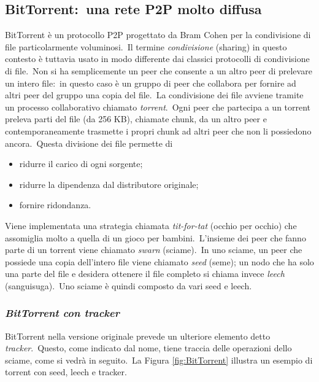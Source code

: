 \subsection{BitTorrent:\ una rete P2P molto diffusa}

BitTorrent è un protocollo P2P progettato da Bram Cohen per la condivisione di file particolarmente voluminosi.\
Il termine \emph{condivisione} (sharing) in questo contesto è tuttavia usato in modo differente dai classici protocolli di condivisione di file.\
Non si ha semplicemente un peer che consente a un altro peer di prelevare un intero file:\ in questo caso è un gruppo di peer che collabora per fornire ad altri peer del gruppo una copia del file.\
La condivisione dei file avviene tramite un processo collaborativo chiamato \emph{torrent}.\
Ogni peer che partecipa a un torrent preleva parti del file (da 256 KB), chiamate chunk, da un altro peer e contemporaneamente trasmette i propri chunk ad altri peer che non li possiedono ancora.\
Questa divisione dei file permette di

\begin{itemize}
    \item ridurre il carico di ogni sorgente;
    \item ridurre la dipendenza dal distributore originale;
    \item fornire ridondanza.
\end{itemize}

\noindent Viene implementata una strategia chiamata \emph{tit-for-tat} (occhio per occhio) che assomiglia molto a quella di un gioco per bambini.\
L'insieme dei peer che fanno parte di un torrent viene chiamato \emph{swarn} (sciame).\
In uno sciame, un peer che possiede una copia dell'intero file viene chiamato \emph{seed} (seme); un nodo che ha solo una parte del file e desidera ottenere il file completo si chiama invece \emph{leech} (sanguisuga).\
Uno sciame è quindi composto da vari seed e leech.

\subsubsection{\emph{BitTorrent con tracker}}

BitTorrent nella versione originale prevede un ulteriore elemento detto \emph{tracker}.\
Questo, come indicato dal nome, tiene traccia delle operazioni dello sciame, come si vedrà in seguito.\
La Figura \ref{fig:BitTorrent} illustra un esempio di torrent con seed, leech e tracker.

